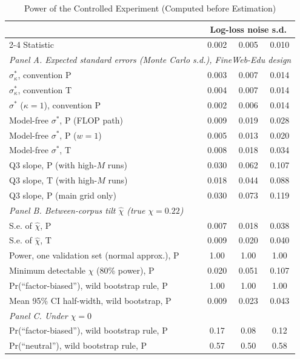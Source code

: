 \begin{table}[tp]
\centering
\caption{Power of the Controlled Experiment (Computed before Estimation)}
\label{tab:m9-power}
\footnotesize
\setlength{\tabcolsep}{3pt}
\begin{tabular*}{\textwidth}{@{\extracolsep{\fill}}lccc@{}}
\toprule
& \multicolumn{3}{c}{Log-loss noise s.d.} \\
\cmidrule(lr){2-4}
Statistic & 0.002 & 0.005 & 0.010 \\
\midrule
\multicolumn{4}{l}{\emph{Panel A. Expected standard errors (Monte Carlo s.d.), FineWeb-Edu design}} \\
$\sigma^*_\kappa$, convention P & 0.003 & 0.007 & 0.014 \\
$\sigma^*_\kappa$, convention T & 0.004 & 0.007 & 0.014 \\
$\sigma^*$ ($\kappa=1$), convention P & 0.002 & 0.006 & 0.014 \\
Model-free $\sigma^*$, P (FLOP path) & 0.009 & 0.019 & 0.028 \\
Model-free $\sigma^*$, P ($w=1$) & 0.005 & 0.013 & 0.020 \\
Model-free $\sigma^*$, T & 0.008 & 0.018 & 0.034 \\
Q3 slope, P (with high-$M$ runs) & 0.030 & 0.062 & 0.107 \\
Q3 slope, T (with high-$M$ runs) & 0.018 & 0.044 & 0.088 \\
Q3 slope, P (main grid only) & 0.030 & 0.073 & 0.119 \\
\multicolumn{4}{l}{\emph{Panel B. Between-corpus tilt $\hat\chi$ (true $\chi=0.22$)}} \\
S.e. of $\hat\chi$, P & 0.007 & 0.018 & 0.038 \\
S.e. of $\hat\chi$, T & 0.009 & 0.020 & 0.040 \\
Power, one validation set (normal approx.), P & 1.00 & 1.00 & 1.00 \\
Minimum detectable $\chi$ (80\% power), P & 0.020 & 0.051 & 0.107 \\
Pr(``factor-biased''), wild bootstrap rule, P & 1.00 & 1.00 & 1.00 \\
Mean 95\% CI half-width, wild bootstrap, P & 0.009 & 0.023 & 0.043 \\
\multicolumn{4}{l}{\emph{Panel C. Under $\chi=0$}} \\
Pr(``factor-biased''), wild bootstrap rule, P & 0.17 & 0.08 & 0.12 \\
Pr(``neutral''), wild bootstrap rule, P & 0.57 & 0.50 & 0.58 \\
\bottomrule
\end{tabular*}


\end{table}
